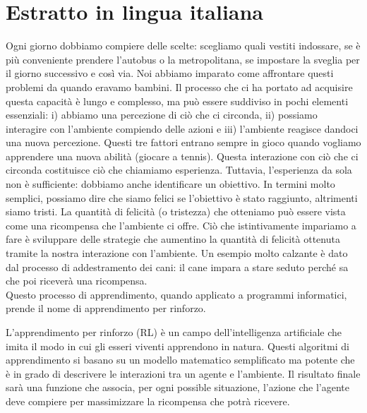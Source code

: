 \chapter*{Estratto in lingua italiana}

Ogni giorno dobbiamo compiere delle scelte: scegliamo quali vestiti indossare, se è più conveniente prendere l'autobus o la metropolitana, se impostare la sveglia per il giorno successivo e così via. Noi abbiamo imparato come affrontare questi problemi da quando eravamo bambini. Il processo che ci ha portato ad acquisire questa capacità è lungo e complesso, ma può essere suddiviso in pochi elementi essenziali: i) abbiamo una percezione di ciò che ci circonda, ii) possiamo interagire con l'ambiente compiendo delle azioni e iii) l'ambiente reagisce dandoci una nuova percezione. Questi tre fattori entrano sempre in gioco quando vogliamo apprendere una nuova abilità (\eg giocare a tennis). 
Questa interazione con ciò che ci circonda costituisce ciò che chiamiamo esperienza. Tuttavia, l'esperienza da sola non è sufficiente: dobbiamo anche identificare un obiettivo. In termini molto semplici, possiamo dire che siamo felici se l'obiettivo è stato raggiunto, altrimenti siamo tristi. La quantità di felicità (o tristezza) che otteniamo può essere vista come una ricompensa che l'ambiente ci offre. Ciò che istintivamente impariamo a fare è sviluppare delle strategie che aumentino la quantità di felicità ottenuta tramite la nostra interazione con l'ambiente. Un esempio molto calzante è dato dal processo di addestramento dei cani: il cane impara a stare seduto perché sa che poi riceverà una ricompensa.\\
Questo processo di apprendimento, quando applicato a programmi informatici, prende il nome di apprendimento per rinforzo.



L'apprendimento per rinforzo (RL) è un campo dell'intelligenza artificiale che imita il modo in cui gli esseri viventi apprendono in natura. Questi algoritmi di apprendimento si basano su un modello matematico semplificato ma potente che è in grado di descrivere le interazioni tra un agente e l'ambiente.
%
Il risultato finale sarà una funzione che associa, per ogni possible situazione, l'azione che l'agente deve compiere per massimizzare la ricompensa che potrà ricevere.


